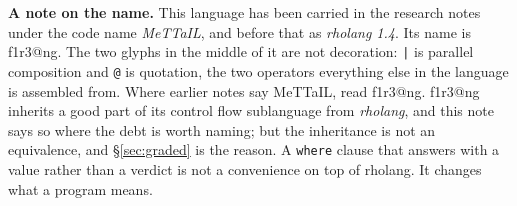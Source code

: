 \documentclass[11pt]{article}
\makeatletter
\theoremstyle{definition}
\theoremstyle{plain}
\theoremstyle{remark}
\newcommand{\flang}{\textsf{f1r3\textbar @ng}}
\makeatother
\begin{document}
\begin{center}
\begin{minipage}{0.92\linewidth}\small
\textbf{A note on the name.} This language has been carried in the research
notes under the code name \emph{MeTTaIL}, and before that as \emph{rholang
1.4}. Its name is \flang{}. The two glyphs in the middle of it are not
decoration: \texttt{|} is parallel composition and \texttt{@} is quotation, the
two operators everything else in the language is assembled from. Where earlier
notes say MeTTaIL, read \flang{}. \flang{} inherits a good part of its control
flow sublanguage from \emph{rholang}, and this note says so where the debt is
worth naming; but the inheritance is not an equivalence, and
\S\ref{sec:graded} is the reason. A \texttt{where} clause that answers with a
value rather than a verdict is not a convenience on top of rholang. It changes
what a program means.
\end{minipage}
\end{center}
\vspace{0.6em}

\tableofcontents







\end{document}
